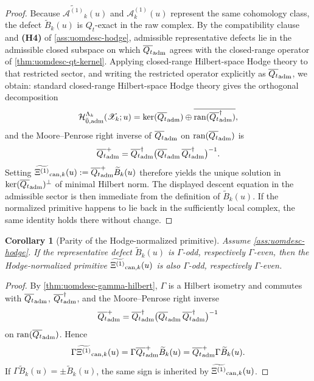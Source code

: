 \documentclass[11pt]{article}
\theoremstyle{definition}
\theoremstyle{plain}
\newtheorem{corollary}[definition]{Corollary}
\theoremstyle{remark}
\newcommand{\Xscr}{\mathscr X}
\newcommand{\Aone}{\mathcal A^{(1)}}
\newcommand{\Xione}{\Xi^{(1)}}
\newcommand{\Qt}{Q_t}
\begin{document}
\begin{proof}
Because \(\widetilde{\Aone}_k(u)\) and \(\Aone_k(u)\) represent the same cohomology class, the
defect \(\widetilde{B}_k(u)\) is \(\Qt\)-exact in the raw complex.
By the compatibility clause and \textbf{(H4)} of \cref{ass:uomdesc-hodge}, admissible
representative defects lie in the admissible closed subspace on which \(\overline{\Qt}_{\rm adm}\)
agrees with the
closed-range operator of \cref{thm:uomdesc-qt-kernel}.
Applying closed-range Hilbert-space Hodge theory to that restricted sector, and writing the
restricted operator explicitly as \(\overline{\Qt}_{\rm adm}\), we obtain:
standard closed-range Hilbert-space Hodge theory gives the orthogonal decomposition
\[
\mathcal H_{\bar 0,{\rm adm}}^{\Lambda_k}(\Xscr_k;u)
=
\ker(\overline{\Qt}_{\rm adm})
\oplus
\overline{\mathrm{ran}(\overline{\Qt}_{\rm adm}^{\dagger})},
\]
and the Moore--Penrose right inverse of \(\overline{\Qt}_{\rm adm}\) on
\(\mathrm{ran}(\overline{\Qt}_{\rm adm})\) is
\[
\overline{\Qt}_{\rm adm}^{+}
=
\overline{\Qt}_{\rm adm}^{\dagger}
\big(\overline{\Qt}_{\rm adm}\,\overline{\Qt}_{\rm adm}^{\dagger}\big)^{-1}.
\]
Setting
\(
\widetilde{\Xione}_{{\rm can},k}(u):=\overline{\Qt}_{\rm adm}^{+}\widetilde{B}_k(u)
\)
therefore yields the unique solution in \(\ker(\overline{\Qt}_{\rm adm})^\perp\) of minimal
Hilbert norm.
The displayed descent equation in the admissible sector is then immediate from the definition of
\(\widetilde{B}_k(u)\).
If the normalized primitive happens to lie back in the sufficiently local complex, the same
identity holds there without change.
\end{proof}

\begin{corollary}[Parity of the Hodge-normalized primitive]
\label{cor:uomdesc-hodge-parity}
Assume \cref{ass:uomdesc-hodge}.
If the representative defect \(\widetilde{B}_k(u)\) is \(\Gamma\)-odd, respectively \(\Gamma\)-even,
then the Hodge-normalized primitive \(\widetilde{\Xione}_{{\rm can},k}(u)\) is also
\(\Gamma\)-odd, respectively \(\Gamma\)-even.
\end{corollary}

\begin{proof}
By \cref{thm:uomdesc-gamma-hilbert}, \(\Gamma\) is a Hilbert isometry and commutes with
\(\overline{\Qt}_{\rm adm}\), \(\overline{\Qt}_{\rm adm}^{\dagger}\), and the Moore--Penrose right
inverse
\[
\overline{\Qt}_{\rm adm}^{+}
=
\overline{\Qt}_{\rm adm}^{\dagger}
\big(\overline{\Qt}_{\rm adm}\,\overline{\Qt}_{\rm adm}^{\dagger}\big)^{-1}
\]
on \(\mathrm{ran}(\overline{\Qt}_{\rm adm})\).
Hence
\[
\Gamma\widetilde{\Xione}_{{\rm can},k}(u)
=
\Gamma\overline{\Qt}_{\rm adm}^{+}\widetilde{B}_k(u)
=
\overline{\Qt}_{\rm adm}^{+}\Gamma\widetilde{B}_k(u).
\]
If \(\Gamma\widetilde{B}_k(u)=\pm\widetilde{B}_k(u)\), the same sign is inherited by
\(\widetilde{\Xione}_{{\rm can},k}(u)\).
\end{proof}
\end{document}
